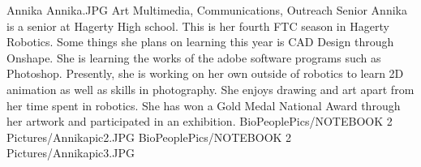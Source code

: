 \insertbio
{Annika}
{Annika.JPG}
{Art}
{Multimedia, Communications, Outreach}
{Senior}
{
Annika is a senior at Hagerty High school. This is her fourth FTC season in Hagerty Robotics. Some things she plans on learning this year is CAD Design through Onshape. She is learning the works of the adobe software programs such as Photoshop. Presently, she is working on her own outside of robotics to learn 2D animation as well as skills in photography.  She enjoys drawing and art apart from her time spent in robotics. She has won a Gold Medal National Award through her artwork and participated in an exhibition.
}
{BioPeoplePics/NOTEBOOK 2 Pictures/Annikapic2.JPG}
{BioPeoplePics/NOTEBOOK 2 Pictures/Annikapic3.JPG}